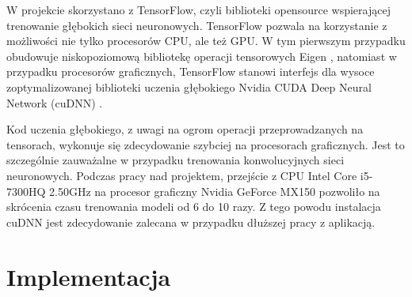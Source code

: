 W projekcie skorzystano z TensorFlow, czyli biblioteki opensource wspierającej trenowanie głębokich sieci neuronowych. TensorFlow pozwala na korzystanie z możliwości nie tylko procesorów CPU, ale też GPU. W tym pierwszym przypadku obudowuje niskopoziomową bibliotekę operacji tensorowych Eigen \cite{Eigen}, natomiast w przypadku procesorów graficznych, TensorFlow stanowi interfejs dla wysoce zoptymalizowanej biblioteki uczenia głębokiego Nvidia CUDA Deep Neural Network (cuDNN) \cite{cuDNN}.

Kod uczenia głębokiego, z uwagi na ogrom operacji przeprowadzanych na tensorach, wykonuje się zdecydowanie szybciej na procesorach graficznych. Jest to szczególnie zauważalne  w przypadku trenowania konwolucyjnych sieci neuronowych. Podczas pracy nad projektem, przejście z CPU Intel Core i5-7300HQ 2.50GHz na procesor graficzny Nvidia GeForce MX150 pozwoliło na skrócenia czasu trenowania modeli od 6 do 10 razy. Z tego powodu instalacja cuDNN jest zdecydowanie zalecana w przypadku dłuższej pracy z aplikacją.


\section{Implementacja}
